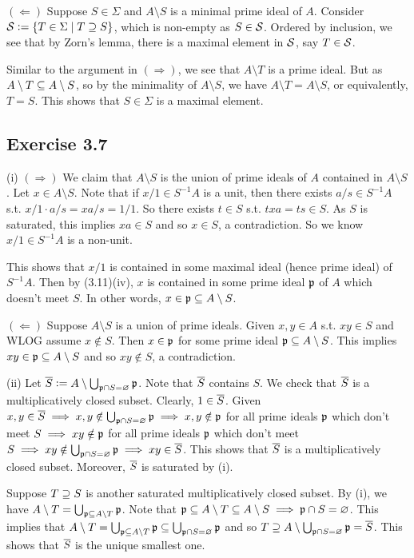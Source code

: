 \documentclass[../A&M.tex]{subfiles}
\begin{document}
$(\Leftarrow)$ Suppose $S\in\Sigma$ and $A\setminus S$ is a minimal prime ideal of $A$. Consider $\mathcal{S}:=\{T\in\Sigma \mid T\supseteq S\}$, which is non-empty as $S\in \mathcal{S}$. Ordered by inclusion, we see that by Zorn's lemma, there is a maximal element in $\mathcal{S}$, say $T \in\mathcal{S}$.

Similar to the argument in $(\Rightarrow)$, we see that $A\setminus T$ is a prime ideal. But as $A\setminus T \subseteq A\setminus S$, so by the minimality of $A\setminus S$, we have $A\setminus T = A\setminus S$, or equivalently, $T=S$. This shows that $S\in\Sigma$ is a maximal element.

\subsection*{Exercise 3.7}

(i) $(\Rightarrow)$ We claim that $A\setminus S$ is the union of prime ideals of $A$ contained in $A\setminus S$. Let $x\in A\setminus S$. Note that if $x/1 \in S^{-1}A$ is a unit, then there exists $a/s \in S^{-1}A$ s.t. $x/1 \cdot a/s = xa/s = 1/1$. So there exists $t\in S$ s.t. $txa = ts \in S$. As $S$ is saturated, this implies $xa\in S$ and so $x\in S$, a contradiction. So we know $x/1 \in S^{-1}A$ is a non-unit.

This shows that $x/1$ is contained in some maximal ideal (hence prime ideal) of $S^{-1}A$. Then by (3.11)(iv), $x$ is contained in some prime ideal $\mathfrak{p}$ of $A$ which doesn't meet $S$. In other words, $x\in \mathfrak{p} \subseteq A\setminus S$.

$(\Leftarrow)$ Suppose $A\setminus S$ is a union of prime ideals. Given $x,y \in A$ s.t. $xy \in S$ and WLOG assume $x \notin S$. Then $x\in \mathfrak{p}$ for some prime ideal $\mathfrak{p} \subseteq A\setminus S$. This implies $xy \in\mathfrak{p} \subseteq A\setminus S$ and so $xy\notin S$, a contradiction.

(ii) Let $\overline{S}:=A \setminus \bigcup_{\mathfrak{p}\cap S=\varnothing} \mathfrak{p}$. Note that $\overline{S}$ contains $S$. We check that $\overline{S}$ is a multiplicatively closed subset. Clearly, $1\in\overline{S}$. Given $x,y\in\overline{S}\implies x,y\notin \bigcup_{\mathfrak{p}\cap S=\varnothing} \mathfrak{p} \implies x,y \notin \mathfrak{p}$ for all prime ideals $\mathfrak{p}$ which don't meet $S \implies xy \notin \mathfrak{p}$ for all prime ideals $\mathfrak{p}$ which don't meet $S \implies xy\notin  \bigcup_{\mathfrak{p}\cap S=\varnothing} \mathfrak{p} \implies xy\in\overline{S}$. This shows that $\overline{S}$ is a multiplicatively closed subset. Moreover, $\overline{S}$ is saturated by (i).

Suppose $T\supseteq S$ is another saturated multiplicatively closed subset. By (i), we have $A\setminus T = \bigcup_{\mathfrak{p}\subseteq A\setminus T} \mathfrak{p}$. Note that $\mathfrak{p} \subseteq A\setminus T \subseteq A\setminus S \implies \mathfrak{p} \cap S = \varnothing$. This implies that $A\setminus T = \bigcup_{\mathfrak{p}\subseteq A\setminus T} \mathfrak{p} \subseteq \bigcup_{\mathfrak{p} \cap S =\varnothing} \mathfrak{p}$ and so $T \supseteq A \setminus \bigcup_{\mathfrak{p}\cap S=\varnothing} \mathfrak{p} = \overline{S}$. This shows that $\overline{S}$ is the unique smallest one.
\end{document}
